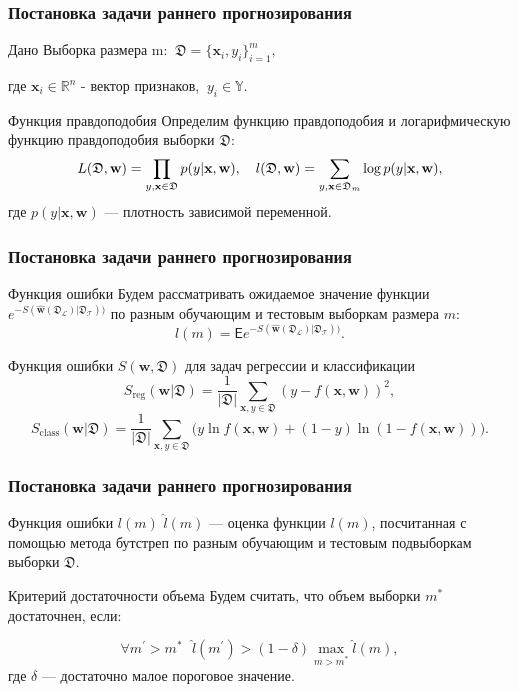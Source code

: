 \documentclass{beamer}
\begin{document}
\begin{frame}
\frametitle{Постановка задачи раннего прогнозирования}
\begin{block}{Дано}
Выборка размера m: $~\mathfrak D = \{\textbf{x}_i, y_i\}_{i=1}^m,$

где $\textbf{x}_i \in \mathbb{R}^{n}$ - вектор признаков, $~y_i \in \mathbb{Y}$.
\end{block}
\begin{block}{Функция правдоподобия}
Определим функцию правдоподобия и логарифмическую функцию правдоподобия выборки $\mathfrak D$:
$$
L(\mathfrak D, \textbf{w}) = \prod_{y, \textbf{x} \in \mathfrak D} p(y | \textbf{x}, \textbf{w}),~~~ l(\mathfrak D, \textbf w) = \sum_{y, \textbf{x} \in \mathfrak D_m}\log p(y | \textbf{x}, \textbf{w}),
$$
где $p(y | \textbf{x}, \textbf{w})$ ---  плотность зависимой переменной.
\end{block}
\end{frame}

\begin{frame}
\frametitle{Постановка задачи раннего прогнозирования}
\begin{block}{Функция ошибки}
Будем рассматривать ожидаемое значение функции $e^{-S(\hat{\mathbf{w}}(\mathfrak{D}_{\mathcal{L}}) | \mathfrak{D}_{\mathcal{T}}))}$ по разным обучающим и тестовым выборкам размера $m$:
$$
l(m) = \mathsf E e^{-S(\hat{\mathbf{w}}(\mathfrak{D}_{\mathcal{L}}) | \mathfrak{D}_{\mathcal{T}}))}.
$$
\end{block}
\begin{block}{Функция ошибки $S(\mathbf{w}, \mathfrak{D})$ для задач регрессии и классификации}
$$
S_{\text{reg}}(\textbf{w} | \mathfrak{D}) = \frac{1}{|\mathfrak{D}|}\sum\limits_{\mathbf{x}, y \in \mathfrak{D}}(y - f(\mathbf{x}, \mathbf{w}))^2,
$$
$$
S_{\text{class}}(\textbf{w} | \mathfrak{D}) =  \frac{1}{|\mathfrak{D}|}\sum\limits_{\mathbf{x}, y \in \mathfrak{D}}\bigl(y\ln f(\mathbf{x}, \mathbf{w}) + (1 - y)\ln(1 - f(\mathbf{x}, \mathbf{w}))\bigr).
$$
\end{block}

\end{frame}


\begin{frame}
\frametitle{Постановка задачи раннего прогнозирования}
\begin{block}{Функция ошибки $l(m)$}
$\hat{l}(m)$ --- оценка функции $l(m)$, посчитанная с помощью метода бутстреп по разным обучающим и тестовым подвыборкам выборки $\mathfrak{D}$.
\end{block}

\begin{block}{Критерий достаточности объема}
Будем считать, что объем выборки $m^*$ достаточнен, если:

$$
\forall m^{\prime} > m^* ~~~ \hat{l}(m^{\prime}) > (1 - \delta)\max\limits_{m > m^*}\hat{l}(m),
$$
где $\delta$ --- достаточно малое пороговое значение.
\end{block}
\end{frame}
\end{document}
